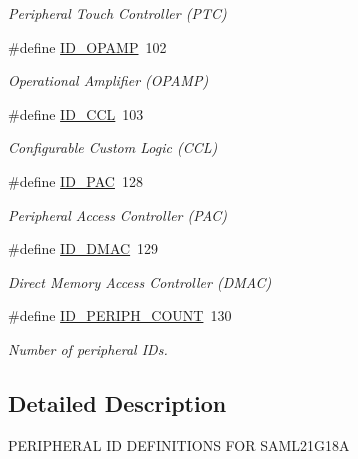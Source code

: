 \begin{DoxyCompactItemize}
\begin{DoxyCompactList}\small\item\em Peripheral Touch Controller (P\+T\+C) \end{DoxyCompactList}\item 
\hypertarget{group___s_a_m_l21_g18_a__id_gae4ae38bb3d3c281c76cceeb30a3d0043}{}\#define \hyperlink{group___s_a_m_l21_g18_a__id_gae4ae38bb3d3c281c76cceeb30a3d0043}{I\+D\+\_\+\+O\+P\+A\+M\+P}~102\label{group___s_a_m_l21_g18_a__id_gae4ae38bb3d3c281c76cceeb30a3d0043}

\begin{DoxyCompactList}\small\item\em Operational Amplifier (O\+P\+A\+M\+P) \end{DoxyCompactList}\item 
\hypertarget{group___s_a_m_l21_g18_a__id_ga8ecff0af934e0f955163cbf8b1e38cda}{}\#define \hyperlink{group___s_a_m_l21_g18_a__id_ga8ecff0af934e0f955163cbf8b1e38cda}{I\+D\+\_\+\+C\+C\+L}~103\label{group___s_a_m_l21_g18_a__id_ga8ecff0af934e0f955163cbf8b1e38cda}

\begin{DoxyCompactList}\small\item\em Configurable Custom Logic (C\+C\+L) \end{DoxyCompactList}\item 
\hypertarget{group___s_a_m_l21_g18_a__id_ga1a7ef008badcb8b13477fd4d9f39c907}{}\#define \hyperlink{group___s_a_m_l21_g18_a__id_ga1a7ef008badcb8b13477fd4d9f39c907}{I\+D\+\_\+\+P\+A\+C}~128\label{group___s_a_m_l21_g18_a__id_ga1a7ef008badcb8b13477fd4d9f39c907}

\begin{DoxyCompactList}\small\item\em Peripheral Access Controller (P\+A\+C) \end{DoxyCompactList}\item 
\hypertarget{group___s_a_m_l21_g18_a__id_ga82f75d497cb286bddbeb5a4cc7acdf6c}{}\#define \hyperlink{group___s_a_m_l21_g18_a__id_ga82f75d497cb286bddbeb5a4cc7acdf6c}{I\+D\+\_\+\+D\+M\+A\+C}~129\label{group___s_a_m_l21_g18_a__id_ga82f75d497cb286bddbeb5a4cc7acdf6c}

\begin{DoxyCompactList}\small\item\em Direct Memory Access Controller (D\+M\+A\+C) \end{DoxyCompactList}\item 
\hypertarget{group___s_a_m_l21_g18_a__id_gad0762589e782b5eca161d9d344306da7}{}\#define \hyperlink{group___s_a_m_l21_g18_a__id_gad0762589e782b5eca161d9d344306da7}{I\+D\+\_\+\+P\+E\+R\+I\+P\+H\+\_\+\+C\+O\+U\+N\+T}~130\label{group___s_a_m_l21_g18_a__id_gad0762589e782b5eca161d9d344306da7}

\begin{DoxyCompactList}\small\item\em Number of peripheral I\+Ds. \end{DoxyCompactList}\end{DoxyCompactItemize}


\subsection{Detailed Description}
P\+E\+R\+I\+P\+H\+E\+R\+A\+L I\+D D\+E\+F\+I\+N\+I\+T\+I\+O\+N\+S F\+O\+R S\+A\+M\+L21\+G18\+A 